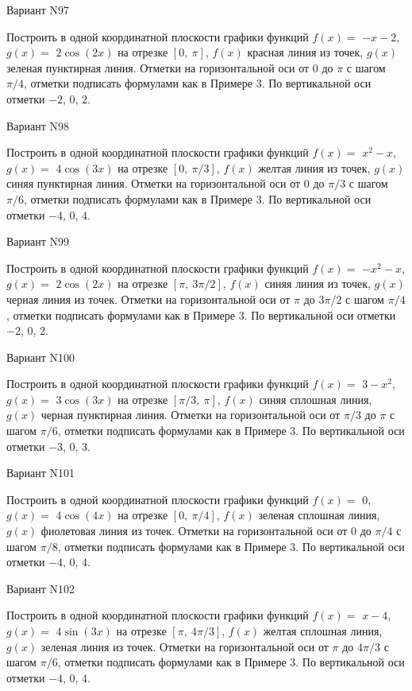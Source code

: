 \documentclass[11pt]{report}
\begin{document}
Вариант N97

Построить в одной координатной плоскости графики функций $f(x) = $
    $- x - 2$, $g(x) = $
    $2 \cos{\left(2 x \right)}$ на 
    отрезке $\left[ 0, \  \pi\right]$, $f(x)$ красная 
    линия из точек, $g(x)$ зеленая пунктирная линия. 
    Отметки на горизонтальной оси от $0$ до $\pi$ с 
    шагом $\pi / 4$, отметки подписать формулами как в Примере 3.  
    По вертикальной оси отметки $-2$, 0, $2$.

Вариант N98

Построить в одной координатной плоскости графики функций $f(x) = $
    $x^{2} - x$, $g(x) = $
    $4 \cos{\left(3 x \right)}$ на 
    отрезке $\left[ 0, \  \pi / 3\right]$, $f(x)$ желтая 
    линия из точек, $g(x)$ синяя пунктирная линия. 
    Отметки на горизонтальной оси от $0$ до $\pi / 3$ с 
    шагом $\pi / 6$, отметки подписать формулами как в Примере 3.  
    По вертикальной оси отметки $-4$, 0, $4$.

Вариант N99

Построить в одной координатной плоскости графики функций $f(x) = $
    $- x^{2} - x$, $g(x) = $
    $2 \cos{\left(2 x \right)}$ на 
    отрезке $\left[ \pi, \  3 \pi / 2\right]$, $f(x)$ синяя 
    линия из точек, $g(x)$ черная линия из точек. 
    Отметки на горизонтальной оси от $\pi$ до $3 \pi / 2$ с 
    шагом $\pi / 4$, отметки подписать формулами как в Примере 3.  
    По вертикальной оси отметки $-2$, 0, $2$.

Вариант N100

Построить в одной координатной плоскости графики функций $f(x) = $
    $3 - x^{2}$, $g(x) = $
    $3 \cos{\left(3 x \right)}$ на 
    отрезке $\left[ \pi / 3, \  \pi\right]$, $f(x)$ синяя 
    сплошная линия, $g(x)$ черная пунктирная линия. 
    Отметки на горизонтальной оси от $\pi / 3$ до $\pi$ с 
    шагом $\pi / 6$, отметки подписать формулами как в Примере 3.  
    По вертикальной оси отметки $-3$, 0, $3$.

Вариант N101

Построить в одной координатной плоскости графики функций $f(x) = $
    $0$, $g(x) = $
    $4 \cos{\left(4 x \right)}$ на 
    отрезке $\left[ 0, \  \pi / 4\right]$, $f(x)$ зеленая 
    сплошная линия, $g(x)$ фиолетовая линия из точек. 
    Отметки на горизонтальной оси от $0$ до $\pi / 4$ с 
    шагом $\pi / 8$, отметки подписать формулами как в Примере 3.  
    По вертикальной оси отметки $-4$, 0, $4$.

Вариант N102

Построить в одной координатной плоскости графики функций $f(x) = $
    $x - 4$, $g(x) = $
    $4 \sin{\left(3 x \right)}$ на 
    отрезке $\left[ \pi, \  4 \pi / 3\right]$, $f(x)$ желтая 
    сплошная линия, $g(x)$ зеленая линия из точек. 
    Отметки на горизонтальной оси от $\pi$ до $4 \pi / 3$ с 
    шагом $\pi / 6$, отметки подписать формулами как в Примере 3.  
    По вертикальной оси отметки $-4$, 0, $4$.
\end{document}
